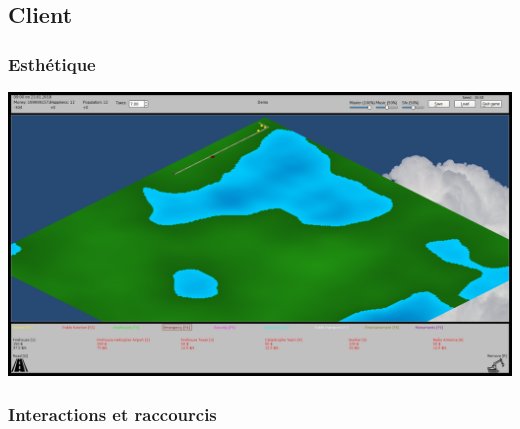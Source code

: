 \documentclass[a4paper,10pt,openany,oneside]{report}
\begin{document}
\subsection{Client}
\subsubsection{Esthétique}
\includegraphics[width=\textwidth]{img/ui_client.png}
\subsubsection{Interactions et raccourcis}
\end{document}
